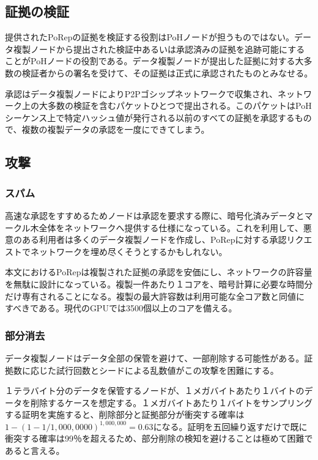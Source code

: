 \documentclass[12pt]{ltjsarticle}
\begin{document}
\subsection{証拠の検証}
提供されたPoRepの証拠を検証する役割はPoHノードが担うものではない。データ複製ノードから提出された検証中あるいは承認済みの証拠を追跡可能にすることがPoHノードの役割である。データ複製ノードが提出した証拠に対する大多数の検証者からの署名を受けて、その証拠は正式に承認されたものとみなせる。

承認はデータ複製ノードによりP2Pゴシップネットワークで収集され、ネットワーク上の大多数の検証を含むパケットひとつで提出される。このパケットはPoHシーケンス上で特定ハッシュ値が発行される以前のすべての証拠を承認するもので、複数の複製データの承認を一度にできてしまう。

\subsection{攻撃}
\subsubsection{スパム}
高速な承認をすすめるためノードは承認を要求する際に、暗号化済みデータとマークル木全体をネットワークへ提供する仕様になっている。これを利用して、悪意のある利用者は多くのデータ複製ノードを作成し、PoRepに対する承認リクエストでネットワークを埋め尽くそうとするかもしれない。

本文におけるPoRepは複製された証拠の承認を安価にし、ネットワークの許容量を無駄に設計になっている。複製一件あたり１コアを、暗号計算に必要な時間分だけ専有されることになる。複製の最大許容数は利用可能な全コア数と同値にすべきである。現代のGPUでは3500個以上のコアを備える。

\subsubsection{部分消去}

データ複製ノードはデータ全部の保管を避けて、一部削除する可能性がある。証拠数に応じた試行回数とシードによる乱数値がこの攻撃を困難にする。

１テラバイト分のデータを保管するノードが、１メガバイトあたり１バイトのデータを削除するケースを想定する。１メガバイトあたり１バイトをサンプリングする証明を実施すると、削除部分と証拠部分が衝突する確率は\(1 - (1- 1/1,000,0000)^{1,000,000} = 0.63\)になる。証明を五回繰り返すだけで既に衝突する確率は99％を超えるため、部分削除の検知を避けることは極めて困難であると言える。
\end{document}
